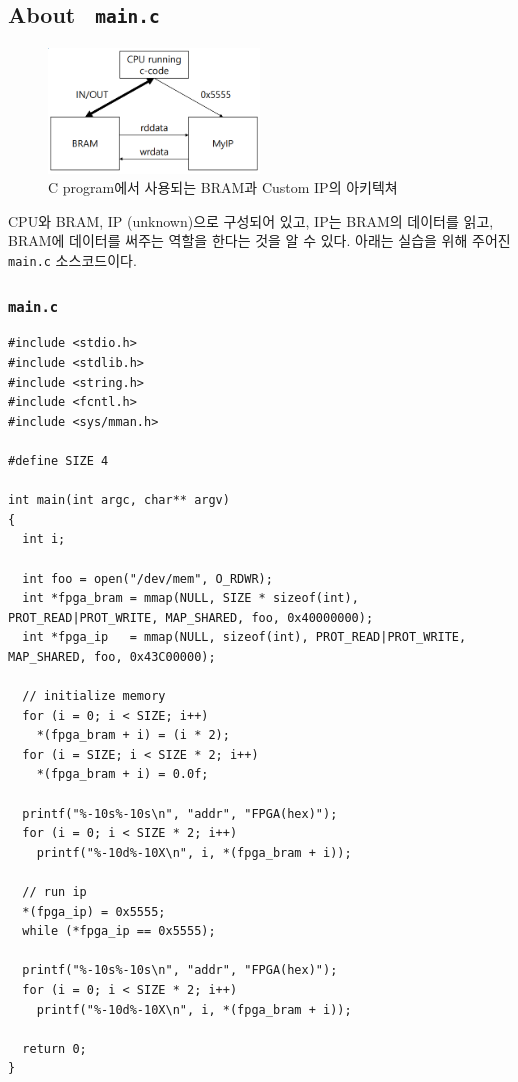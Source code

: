 \documentclass{article}
\begin{document}
\newpage
\subsection{About \ \texttt{main.c}}
\begin{figure}[ht]
	\centering
	\includegraphics[width=0.5\textwidth]{fig/program_arch.PNG}
\caption{C program에서 사용되는 BRAM과 Custom IP의 아키텍쳐~\cite{lab}}
\label{fig2}
\end{figure}

CPU와 BRAM, IP (unknown)으로 구성되어 있고, IP는 BRAM의 데이터를 읽고, BRAM에 데이터를 써주는 역할을 한다는 것을 알 수 있다. 아래는 실습을 위해 주어진 \texttt{main.c} 소스코드이다.

\subsubsection*{\texttt{main.c}}
\begin{lstlisting}[style={c-style}]
#include <stdio.h>
#include <stdlib.h>
#include <string.h>
#include <fcntl.h>
#include <sys/mman.h>

#define SIZE 4

int main(int argc, char** argv)
{
  int i;

  int foo = open("/dev/mem", O_RDWR);
  int *fpga_bram = mmap(NULL, SIZE * sizeof(int), PROT_READ|PROT_WRITE, MAP_SHARED, foo, 0x40000000);
  int *fpga_ip   = mmap(NULL, sizeof(int), PROT_READ|PROT_WRITE, MAP_SHARED, foo, 0x43C00000);

  // initialize memory
  for (i = 0; i < SIZE; i++)
    *(fpga_bram + i) = (i * 2); 
  for (i = SIZE; i < SIZE * 2; i++)
    *(fpga_bram + i) = 0.0f; 

  printf("%-10s%-10s\n", "addr", "FPGA(hex)");
  for (i = 0; i < SIZE * 2; i++)
    printf("%-10d%-10X\n", i, *(fpga_bram + i));

  // run ip
  *(fpga_ip) = 0x5555;
  while (*fpga_ip == 0x5555);

  printf("%-10s%-10s\n", "addr", "FPGA(hex)");
  for (i = 0; i < SIZE * 2; i++)
    printf("%-10d%-10X\n", i, *(fpga_bram + i));

  return 0;
}
\end{lstlisting}
\end{document}
